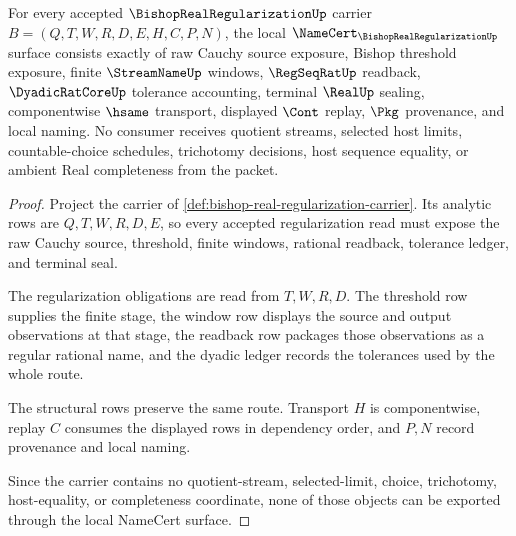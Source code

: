 \begin{theorem}
\label{thm:bishop-real-regularization-namecert-obligations}
For every accepted $\BishopRealRegularizationUp$ carrier $B=(Q,T,W,R,D,E,H,C,P,N)$, the local $\NameCert_{\BishopRealRegularizationUp}$ surface consists exactly of raw Cauchy source exposure, Bishop threshold exposure, finite $\StreamNameUp$ windows, $\RegSeqRatUp$ readback, $\DyadicRatCoreUp$ tolerance accounting, terminal $\RealUp$ sealing, componentwise $\hsame$ transport, displayed $\Cont$ replay, $\Pkg$ provenance, and local naming. No consumer receives quotient streams, selected host limits, countable-choice schedules, trichotomy decisions, host sequence equality, or ambient Real completeness from the packet.
\end{theorem}
\begin{proof}
Project the carrier of \autoref{def:bishop-real-regularization-carrier}. Its analytic rows are $Q,T,W,R,D,E$, so every accepted regularization read must expose the raw Cauchy source, threshold, finite windows, rational readback, tolerance ledger, and terminal seal.

The regularization obligations are read from $T,W,R,D$. The threshold row supplies the finite stage, the window row displays the source and output observations at that stage, the readback row packages those observations as a regular rational name, and the dyadic ledger records the tolerances used by the whole route.

The structural rows preserve the same route. Transport $H$ is componentwise, replay $C$ consumes the displayed rows in dependency order, and $P,N$ record provenance and local naming.

Since the carrier contains no quotient-stream, selected-limit, choice, trichotomy, host-equality, or completeness coordinate, none of those objects can be exported through the local NameCert surface.
\end{proof}

